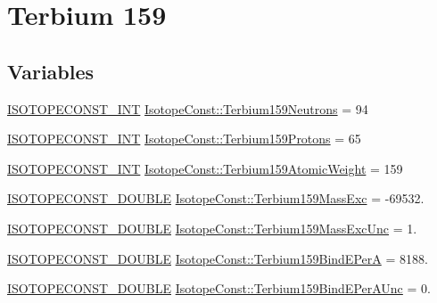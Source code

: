 \hypertarget{group___isotope_const-_terbium-_tb159}{}\section{Terbium 159}
\label{group___isotope_const-_terbium-_tb159}
\subsection*{Variables}
\begin{DoxyCompactItemize}
\item 
\mbox{\hyperlink{group___isotope_const-_macros_ga5f18360b3e99483a35c32d789e62621c}{I\+S\+O\+T\+O\+P\+E\+C\+O\+N\+S\+T\+\_\+\+I\+NT}} \mbox{\hyperlink{group___isotope_const-_terbium-_tb159_gaba340d1fa17a868a5b38fe3e58dd2a55}{Isotope\+Const\+::\+Terbium159\+Neutrons}} = 94
\item 
\mbox{\hyperlink{group___isotope_const-_macros_ga5f18360b3e99483a35c32d789e62621c}{I\+S\+O\+T\+O\+P\+E\+C\+O\+N\+S\+T\+\_\+\+I\+NT}} \mbox{\hyperlink{group___isotope_const-_terbium-_tb159_ga9e85ea8be95abb0f3f603f83478934b4}{Isotope\+Const\+::\+Terbium159\+Protons}} = 65
\item 
\mbox{\hyperlink{group___isotope_const-_macros_ga5f18360b3e99483a35c32d789e62621c}{I\+S\+O\+T\+O\+P\+E\+C\+O\+N\+S\+T\+\_\+\+I\+NT}} \mbox{\hyperlink{group___isotope_const-_terbium-_tb159_ga0c2ccc5ba89937e8cfd6db36dcf32e3d}{Isotope\+Const\+::\+Terbium159\+Atomic\+Weight}} = 159
\item 
\mbox{\hyperlink{group___isotope_const-_macros_ga8f45a7272ce02c0b4c65c44636ed719a}{I\+S\+O\+T\+O\+P\+E\+C\+O\+N\+S\+T\+\_\+\+D\+O\+U\+B\+LE}} \mbox{\hyperlink{group___isotope_const-_terbium-_tb159_ga3bd8cd16b21771e7beec95db70f54197}{Isotope\+Const\+::\+Terbium159\+Mass\+Exc}} = -\/69532.
\item 
\mbox{\hyperlink{group___isotope_const-_macros_ga8f45a7272ce02c0b4c65c44636ed719a}{I\+S\+O\+T\+O\+P\+E\+C\+O\+N\+S\+T\+\_\+\+D\+O\+U\+B\+LE}} \mbox{\hyperlink{group___isotope_const-_terbium-_tb159_gaa4dd5e7f3c7ae2c0c483f017792d48a5}{Isotope\+Const\+::\+Terbium159\+Mass\+Exc\+Unc}} = 1.
\item 
\mbox{\hyperlink{group___isotope_const-_macros_ga8f45a7272ce02c0b4c65c44636ed719a}{I\+S\+O\+T\+O\+P\+E\+C\+O\+N\+S\+T\+\_\+\+D\+O\+U\+B\+LE}} \mbox{\hyperlink{group___isotope_const-_terbium-_tb159_ga9e1290d485cb6f491a2616d657dbba17}{Isotope\+Const\+::\+Terbium159\+Bind\+E\+PerA}} = 8188.
\item 
\mbox{\hyperlink{group___isotope_const-_macros_ga8f45a7272ce02c0b4c65c44636ed719a}{I\+S\+O\+T\+O\+P\+E\+C\+O\+N\+S\+T\+\_\+\+D\+O\+U\+B\+LE}} \mbox{\hyperlink{group___isotope_const-_terbium-_tb159_ga2f9ae881e3074cdd23a3b66c95c0a736}{Isotope\+Const\+::\+Terbium159\+Bind\+E\+Per\+A\+Unc}} = 0.

\end{DoxyCompactItemize}
